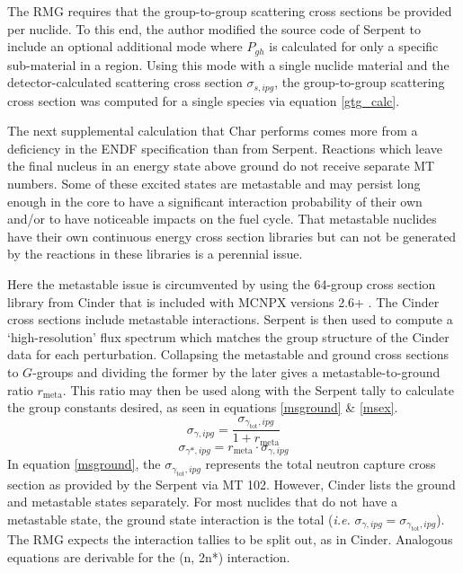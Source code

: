 The RMG requires that the group-to-group scattering cross sections be provided 
per nuclide. To this end, the author modified the source code of Serpent to include an optional 
additional mode where $P_{gh}$ is calculated for only a specific sub-material in a region.    
Using this mode with a single nuclide material and the detector-calculated
scattering cross section $\sigma_{s,ipg}$, the group-to-group scattering cross section was computed 
for a single species via equation \ref{gtg_calc}.

The next supplemental calculation that Char performs comes more from a deficiency in the 
ENDF specification than from Serpent.  Reactions which leave the final nucleus in an energy
state above ground do not receive separate MT numbers.  Some of these excited states
are metastable and may persist long enough in the core to have a significant interaction 
probability of their own and/or to have noticeable impacts on the fuel cycle. That metastable 
nuclides have their own continuous energy cross section libraries
but can not be generated by the reactions in these libraries is a perennial issue.

Here the metastable issue is circumvented by using the 64-group cross section library from Cinder that is 
included with MCNPX versions 2.6+ \cite{Pelowitz2008}.  The Cinder cross sections include metastable
interactions.  Serpent is then used to compute a `high-resolution' 
flux spectrum which matches the group structure of the Cinder data for each perturbation.  
Collapsing the metastable and ground cross sections to $G$-groups and dividing the former by 
the later gives a metastable-to-ground ratio $r_{\mbox{meta}}$.  This ratio may then be used along with 
the Serpent tally to calculate the group constants desired, as seen in equations \ref{msground} \& 
\ref{msex}.
\begin{equation}
\label{msground}
\sigma_{\gamma,ipg} = \frac{\sigma_{\gamma_{\mbox{tot}},ipg}}{1 + r_{\mbox{meta}}}
\end{equation}
\begin{equation}
\label{msex}
\sigma_{\gamma*,ipg} = r_{\mbox{meta}} \cdot \sigma_{\gamma,ipg}
\end{equation}
In equation \ref{msground}, the $\sigma_{\gamma_{\mbox{tot}},ipg}$ represents the total neutron
capture cross section as provided by the Serpent via MT 102.  However, Cinder 
lists the ground and metastable states separately.  For most nuclides that do not have a metastable state, the 
ground state interaction is the total (\emph{i.e.} $\sigma_{\gamma,ipg} = \sigma_{\gamma_{\mbox{tot}},ipg}$).
The RMG expects the interaction tallies to be split out, as in Cinder.  Analogous equations are 
derivable for the (n, 2n*) interaction.

